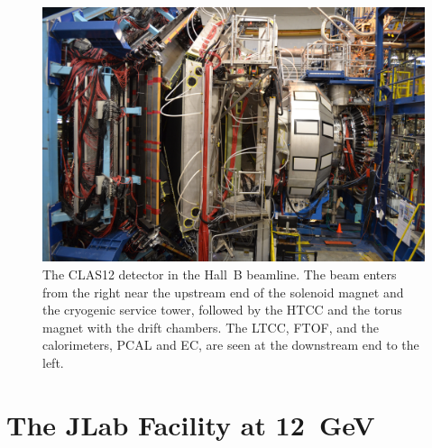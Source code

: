 \documentclass[final,3p,twocolumn]{elsarticle}
\begin{document}
\begin{figure}[bhtp!]
\centerline{\includegraphics[width=1.4\columnwidth]{CLAS12_photo-1.jpg}}
\caption{The CLAS12 detector in the Hall~B beamline. The beam enters from the right near the upstream end of
  the solenoid magnet and the cryogenic service tower, followed by the HTCC and the torus magnet with the drift
  chambers. The LTCC, FTOF, and the calorimeters, PCAL and EC, are seen at the downstream end to the left.}
\label{clas12-photo}
\end{figure}

\section{The JLab Facility at 12~GeV}
\label{jlab}
\end{document}

